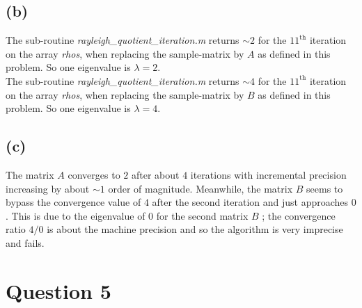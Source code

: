 \documentclass[12pt]{article}
\begin{document}
		\subsection*{(b)}
			The sub-routine \textit{rayleigh_quotient_iteration.m} returns $\sim 2$ for the $11^{\text{th}}$ iteration on the array \textit{rhos}, when replacing the sample-matrix by $A$ as defined in this problem. So one eigenvalue is $\lambda =2$. \\
			
			\noindent  The sub-routine \textit{rayleigh_quotient_iteration.m} returns $\sim 4$ for the $11^{\text{th}}$ iteration on the array \textit{rhos}, when replacing the sample-matrix by $B$ as defined in this problem. So one eigenvalue is $\lambda =4$. 
 			
		\subsection*{(c)}
			The matrix $A$ converges to $2$ after about $4$ iterations with incremental precision increasing by about $\sim 1$ order of magnitude. Meanwhile, the matrix $B$ seems to bypass the convergence value of $4$ after the second iteration and just approaches $0$. This is due to the eigenvalue of $0$ for the second matrix $B$ ; the convergence ratio $4/0$ is about the machine precision and so the algorithm is very imprecise and fails. 
	\section*{Question 5}
\end{document}
